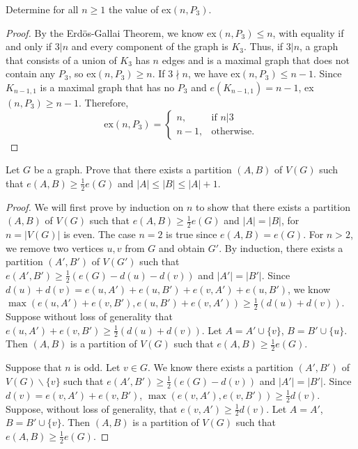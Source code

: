 \documentclass{article}
\newenvironment{problem}[2][Problem]{\begin{trivlist}
\item[\hskip \labelsep {\bfseries #1}\hskip \labelsep {\bfseries #2.}]}{\end{trivlist}}
\begin{document}
\begin{problem}{5.9.3}
     Determine for all $n \geq 1$ the value of ex$(n, P_3)$.
\end{problem}

\begin{proof}
    By the Erdös-Gallai Theorem, we know ex$(n, P_3) \leq n$, with equality if and only if $3|n$ and every component of the graph is $K_3$. Thus, if $3|n$, a graph that consists of a union of $K_3$ has $n$ edges and is a maximal graph that does not contain any $P_3$, so ex$(n, P_3) \geq n$. If $3 \nmid n$, we have ex$(n, P_3) \leq n - 1$. Since $K_{n-1,1}$ is a maximal graph that has no $P_3$ and $e(K_{n-1,1}) = n - 1$, ex$(n, P_3) \geq n - 1$. Therefore, \[
        \text{ex}(n,P_3)= \begin{cases}
        n,      & \text{if } n | 3 \\
        n - 1,  & \text{otherwise}.
        \end{cases}
    \]
\end{proof}

\begin{problem}{5.9.8}
    Let $G$ be a graph. Prove that there exists a partition $(A, B)$ of $V(G)$ such that $e(A,B) \geq \frac{1}{2}e(G)$ and $|A| \leq |B| \leq |A| + 1$.
\end{problem}

\begin{proof}
    We will first prove by induction on $n$ to show that there exists a partition $(A, B)$ of $V(G)$ such that $e(A,B) \geq \frac{1}{2}e(G)$ and $|A| = |B|$, for $n = |V(G)|$ is even. The case $n = 2$ is true since $e(A, B) = e(G)$. For $n > 2$, we remove two vertices $u, v$ from $G$ and obtain $G'$. By induction, there exists a partition $(A', B')$ of $V(G')$ such that $e(A', B') \geq \frac{1}{2}(e(G) - d(u) - d(v))$ and $|A'| = |B'|$. Since $d(u) + d(v) = e(u, A') + e(u, B') + e(v, A') + e(u, B')$, we know $\max(e(u, A') + e(v, B'), e(u, B') + e(v, A')) \geq \frac{1}{2}(d(u) + d(v))$. Suppose without loss of generality that $e(u, A') + e(v, B') \geq \frac{1}{2}(d(u) + d(v))$. Let $A = A' \cup \{v\}$, $B = B' \cup \{u\}$. Then $(A, B)$ is a partition of $V(G)$ such that $e(A, B) \geq \frac{1}{2}e(G)$. 
    
    Suppose that $n$ is odd. Let $v \in G$. We know there exists a partition $(A',B')$ of $V(G)\backslash \{v\}$ such that $e(A',B') \geq \frac{1}{2}(e(G) - d(v))$ and $|A'| = |B'|$. Since $d(v) = e(v, A') + e(v, B')$, $\max(e(v, A'), e(v, B')) \geq \frac{1}{2}d(v)$. Suppose, without loss of generality, that $e(v, A') \geq \frac{1}{2}d(v)$. Let $A = A'$, $B = B' \cup \{v\}$. Then $(A,B)$ is a partition of $V(G)$ such that $e(A,B) \geq \frac{1}{2}e(G)$.
\end{proof} 
\end{document}
